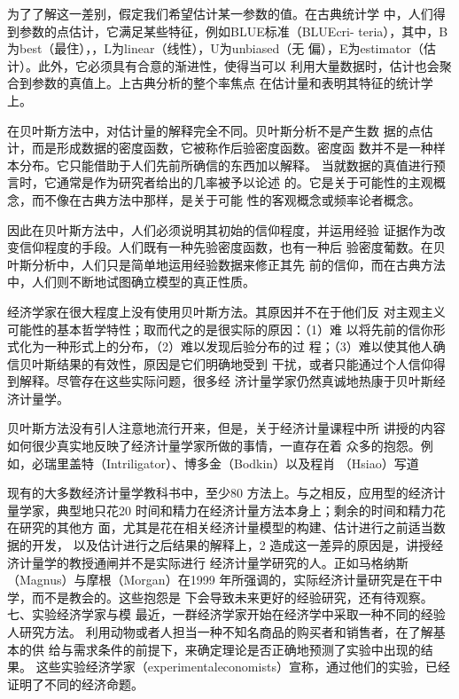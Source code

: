 为了了解这一差别，假定我们希望估计某一参数的值。在古典统计学
中，人们得到参数的点估计，它满足某些特征，例如BLUE标准（BLUEcri-
teria），其中，B为best（最住），，L为linear（线性），U为unbiased（无
偏），E为estimator（估计）。此外，它必须具有合意的渐进性，使得当可以
利用大量数据时，估计也会聚合到参数的真值上。上古典分析的整个率焦点
在估计量和表明其特征的统计学上。

在贝叶斯方法中，对估计量的解释完全不同。贝叶斯分析不是产生数
据的点估计，而是形成数据的密度函数，它被称作后验密度函数。密度函
数并不是一种样本分布。它只能借助于人们先前所确信的东西加以解释。
当就数据的真值进行预言时，它通常是作为研究者给出的几率被予以论述
的。它是关于可能性的主观概念，而不像在古典方法中那样，是关于可能
性的客观概念或频率论者概念。

因此在贝叶斯方法中，人们必须说明其初始的信仰程度，并运用经验
证据作为改变信仰程度的手段。人们既有一种先验密度函数，也有一种后
验密度葡数。在贝叶斯分析中，人们只是简单地运用经验数据来修正其先
前的信仰，而在古典方法中，人们则不断地试图确立模型的真正性质。

经济学家在很大程度上没有使用贝叶斯方法。其原因并不在于他们反
对主观主义可能性的基本哲学特性；取而代之的是很实际的原因：（1）难
以将先前的信你形式化为一种形式上的分布，（2）难以发现后验分布的过
程；（3）难以使其他人确信贝叶斯结果的有效性，原因是它们明确地受到
干扰，或者只能通过个人信仰得到解释。尽管存在这些实际问题，很多经
济计量学家仍然真诚地热康于贝叶斯经济计量学。

贝叶斯方法没有引人注意地流行开来，但是，关于经济计量课程中所
讲授的内容如何很少真实地反映了经济计量学家所做的事情，一直存在着
众多的抱怨。例如，必瑞里盖特（Intriligator）、博多金（Bodkin）以及程肖
（Hsiao）写道


现有的大多数经济计量学教科书中，至少80%
方法上。与之相反，应用型的经济计量学家，典型地只花20%
时间和精力在经济计量方法本身上；剩余的时间和精力花在研究的其他方
面，尤其是花在相关经济计量模型的构建、估计进行之前适当数据的开发，
以及估计进行之后结果的解释上，2
造成这一差异的原因是，讲授经济计量学的教授通闸并不是实际进行
经济计量学研究的人。正如马格纳斯（Magnus）与摩根（Morgan）在1999
年所强调的，实际经济计量研究是在干中学，而不是教会的。这些抱怨是
下会导致未来更好的经验研究，还有待观察。
七、实验经济学家与模
最近，一群经济学家开始在经济学中采取一种不同的经验人研究方法。
利用动物或者人担当一种不知名商品的购买者和销售者，在了解基本的供
给与需求条件的前提下，来确定理论是否正确地预测了实验中出现的结果。
这些实验经济学家（experimentaleconomists）宣称，通过他们的实验，已经
证明了不同的经济命题。

